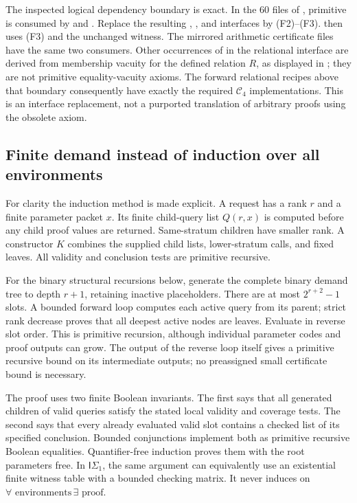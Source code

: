 The inspected logical dependency boundary is exact.
In the 60 files of , primitive
 is consumed by
 and
.  Replace the resulting
, , and
 interfaces by (F2)--(F3).
 then uses (F3) and the unchanged witness.
The mirrored arithmetic certificate files have the same two consumers.
Other occurrences of  in the
relational interface are derived from membership vacuity for the
defined relation $R$, as displayed in
; they are not primitive
equality-vacuity axioms.  The forward relational recipes above that
boundary consequently have exactly the required $\mathcal C_4$
implementations.  This is an interface replacement, not a purported
translation of arbitrary proofs using the obsolete axiom.

\subsection{Finite demand instead of induction over all environments}

For clarity the induction method is made explicit.  A request has a
rank $r$ and a finite parameter packet $x$.  Its finite child-query
list $Q(r,x)$ is computed before any child proof values are returned.
Same-stratum children have smaller rank.  A constructor $K$ combines
the supplied child lists, lower-stratum calls, and fixed leaves.
All validity and conclusion tests are primitive recursive.

For the binary structural recursions below, generate the complete
binary demand tree to depth $r+1$, retaining inactive placeholders.
There are at most $2^{r+2}-1$ slots.  A bounded forward loop computes
each active query from its parent; strict rank decrease proves that
all deepest active nodes are leaves.  Evaluate in reverse slot order.
This is primitive recursion, although individual parameter codes and
proof outputs can grow.  The output of the reverse loop itself gives
a primitive recursive bound on its intermediate outputs; no
preassigned small certificate bound is necessary.

The proof uses two finite Boolean invariants.  The first says that
all generated children of valid queries satisfy the stated local
validity and coverage tests.  The second says that every already
evaluated valid slot contains a checked list of its specified
conclusion.  Bounded conjunctions implement both as primitive
recursive Boolean equalities.  Quantifier-free induction proves them
with the root parameters free.  In $\mathsf I\Sigma _1$, the same
argument can equivalently use an existential finite witness table
with a bounded checking matrix.  It never induces on
$\forall\text{ environments}\,\exists\text{ proof}$.

